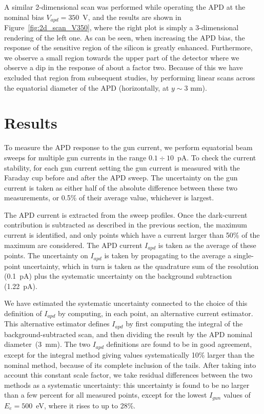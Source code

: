 \documentclass[12p]{paper}
\begin{document}
A similar 2-dimensional scan was performed while operating the APD at the nominal bias $V_{apd}=350$~V, and the results are shown in Figure~\ref{fig:2d_scan_V350}, where the right plot is simply a 3-dimensional rendering of the left one. As can be seen, when increasing the APD bias, the response of the sensitive region of the silicon is greatly enhanced. Furthermore, we observe a small region towards the upper part of the detector where we observe a dip in the response of about a factor two. Because of this we have excluded that region from subsequent studies, by performing linear scans across the equatorial diameter of the APD (horizontally, at $y\sim 3$ mm).
\clearpage

\section{Results}

To measure the APD response to the gun current, we perform equatorial beam sweeps for multiple gun currents in the range $0.1 \div 10$~pA. To check the current stability, for each gun current setting the gun current is measured with the Faraday cup before and after the APD sweep. The uncertainty on the gun current is taken as either half of the absolute difference between these two measurements, or 0.5\% of their average value, whichever is largest.

The APD current is extracted from the sweep profiles. Once the dark-current contribution is subtracted as described in the previous section, the maximum current is identified, and only points which have a current larger than 50\% of the maximum are considered. The APD current $I_{apd}$ is taken as the average of these points. The uncertainty on $I_{apd}$ is taken by propagating to the average a single-point uncertainty, which in turn is taken as the quadrature sum of the resolution (0.1~pA) plus the systematic uncertainty on the background subtraction (1.22~pA).

We have estimated the systematic uncertainty connected to the choice of this definition of $I_{apd}$ by computing, in each point, an alternative current estimator. This alternative estimator defines $I_{apd}$ by first computing the integral of the background-subtracted scan, and then dividing the result by the APD nominal diameter~(3~mm). The two $I_{apd}$ definitions are found to be in good agreement,  except for the integral method giving values systematically 10\% larger than the nominal method, because of its complete inclusion of the tails. After taking into account this constant scale factor, we take residual differences between the two methods as a systematic uncertainty: this uncertainty is found to be no larger than a few percent for all measured points, except for the lowest $I_{gun}$ values of $E_e = 500$~eV, where it rises to up to 28\%. 
\end{document}
